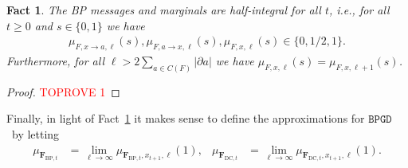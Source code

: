 \documentclass[10pt,reqno]{amsart}
\numberwithin{equation}{section}
\renewcommand{\vec}[1]{\boldsymbol{#1}}
\newcommand{\FBP}[1]{\PHI_{\mathrm{BP},{#1}}}
\newcommand{\FDC}[1]{\PHI_{\mathrm{DC},{#1}}}
\newcommand{\BPGD}{\ensuremath{\mathtt{BPGD}}}
\newcommand\PHI{\vec F}
\newtheorem{fact}[definition]{Fact}
\begin{document}
\begin{fact}\label{fact_halfint}
	The BP messages and marginals are half-integral for all $t$, i.e., for all $t\geq0$ and $s\in\{0,1\}$ we have
	\begin{align}\label{eqfact_halfint}
			\mu_{F,x\to a,\ell}(s),\mu_{F,a\to x,\ell}(s),\mu_{F,x,\ell}(s)\in\{0,1/2,1\}.
		\end{align}
		Furthermore, for all $\ell>2\sum_{a\in C(F)}|\partial a|$ we have $\mu_{F,x,\ell}(s)=\mu_{F,x,\ell+1}(s)$.
\end{fact}
\begin{proof}\textcolor{red}{TOPROVE 1}\end{proof}

\noindent
Finally, in light of Fact~\ref{fact_halfint} it makes sense to define the approximations for \BPGD\ by letting
\begin{align}\label{eqmuBPGD}
	\mu_{\FBP t}&=\lim_{\ell\to\infty}\mu_{\FBP t,x_{t+1},\ell}(1),&
	\mu_{\FDC t}&=\lim_{\ell\to\infty}\mu_{\FDC t,x_{t+1},\ell}(1).
\end{align}
\end{document}
